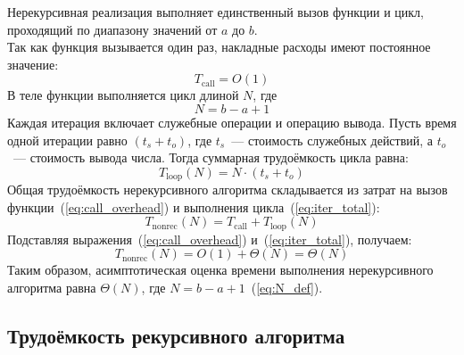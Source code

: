 Нерекурсивная реализация выполняет единственный вызов функции и цикл, проходящий по диапазону значений от $a$ до $b$.\\
Так как функция вызывается один раз, накладные расходы имеют постоянное значение:
\begin{equation}
	\label{eq:call_overhead}
	T_{\text{call}} = O(1)
\end{equation}
В теле функции выполняется цикл длиной $N$, где
\begin{equation}
	\label{eq:N_def}
	N = b - a + 1
\end{equation}
Каждая итерация включает служебные операции и операцию вывода. Пусть время одной итерации равно $(t_s + t_o)$, где $t_s$~--- стоимость служебных действий, а $t_o$~--- стоимость вывода числа. Тогда суммарная трудоёмкость цикла равна:
\begin{equation}
	\label{eq:iter_total}
	T_{\text{loop}}(N) = N \cdot (t_s + t_o)
\end{equation}
Общая трудоёмкость нерекурсивного алгоритма складывается из затрат на вызов функции~(\ref{eq:call_overhead}) и выполнения цикла~(\ref{eq:iter_total}):
\begin{equation}
	\label{eq:T_nonrec_total}
	T_{\text{nonrec}}(N) = T_{\text{call}} + T_{\text{loop}}(N)
\end{equation}
Подставляя выражения~(\ref{eq:call_overhead}) и~(\ref{eq:iter_total}), получаем:
\begin{equation}
	\label{eq:T_nonrec_asymp}
	T_{\text{nonrec}}(N) = O(1) + \Theta(N) = \Theta(N)
\end{equation}
Таким образом, асимптотическая оценка времени выполнения нерекурсивного алгоритма равна $\Theta(N)$, где $N = b - a + 1$~(\ref{eq:N_def}).

\subsection{Трудоёмкость рекурсивного алгоритма}

